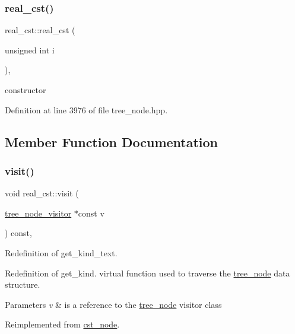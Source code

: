 \subsubsection{\texorpdfstring{real\+\_\+cst()}{real\_cst()}}
{\footnotesize\ttfamily real\+\_\+cst\+::real\+\_\+cst (\begin{DoxyParamCaption}\item[{unsigned int}]{i }\end{DoxyParamCaption})\hspace{0.3cm}{\ttfamily [inline]}, {\ttfamily [explicit]}}



constructor 



Definition at line 3976 of file tree\+\_\+node.\+hpp.



\subsection{Member Function Documentation}
\mbox{\label{structreal__cst_ae6808fef9486f7f044fde5befedf425a}} 
\subsubsection{\texorpdfstring{visit()}{visit()}}
{\footnotesize\ttfamily void real\+\_\+cst\+::visit (\begin{DoxyParamCaption}\item[{\hyperlink{classtree__node__visitor}{tree\+\_\+node\+\_\+visitor} $\ast$const}]{v }\end{DoxyParamCaption}) const\hspace{0.3cm}{\ttfamily [override]}, {\ttfamily [virtual]}}



Redefinition of get\+\_\+kind\+\_\+text. 

Redefinition of get\+\_\+kind. virtual function used to traverse the \hyperlink{classtree__node}{tree\+\_\+node} data structure. 
\begin{DoxyParams}{Parameters}
{\em v} & is a reference to the \hyperlink{classtree__node}{tree\+\_\+node} visitor class \\
\hline
\end{DoxyParams}


Reimplemented from \hyperlink{structcst__node_a64e2bc20ffda1b13ffe894cacb982f89}{cst\+\_\+node}.



